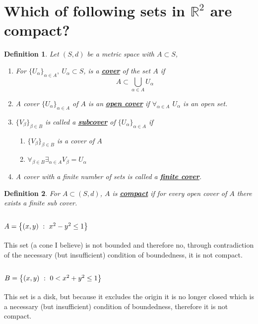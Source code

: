 \documentclass[]{article}
\newcommand{\R}{\mathbb{R}}
\newcommand{\st}{\ : \ }
\newtheorem{definition}{Definition}
\begin{document}
\newpage
\section{Which of following sets in $\R^2$ are compact?}
\begin{definition}
    Let $(S,d)$ be a metric space with $A \subset S$,
    \begin{enumerate}
        \item For $\{U_\alpha\}_{\alpha \in A}, \ U_\alpha \subset S$, is a \textbf{\underline{cover}} of the set $A$ if 
        $$A \subset \bigcup_{\alpha\in A} U_\alpha$$
        \item A cover $\{U_\alpha\}_{\alpha \in A}$ of $A$ is an \textbf{\underline{open cover}} if $\forall_{\alpha \in A}$ $U_\alpha$ is an open set.
        \item $\{V_\beta\}_{\beta\in B}$ is called a \textbf{\underline{subcover}} of $\{U_\alpha\}_{\alpha \in A}$ if
        \begin{enumerate}
            \item $\{V_\beta\}_{\beta\in B}$ is a cover of $A$
            \item $\forall_{\beta \in B} \exists_{\alpha \in A} V_\beta = U_\alpha$
        \end{enumerate}
        \item A cover with a finite number of sets is called a \textbf{\underline{finite cover}}.
    \end{enumerate}
\end{definition}
\begin{definition}
    For $A \subset (S,d)$, $A$ is \textbf{\underline{compact}} if for every open cover of $A$ there exists a finite sub cover.
\end{definition}

\subsection{$A = \qty{(x,y) \st x^2 - y^2 \leq 1}$}
This set (a cone I believe) is not bounded and therefore no, through contradiction of the necessary (but insufficient) condition of boundedness, it is not compact.

\subsection{$B = \qty{(x,y) \st 0 < x^2 + y^2 \leq 1}$}
This set is a disk, but because it excludes the origin it is no longer closed which is a necessary (but insufficient) condition of boundedness, therefore it is not compact.
\end{document}
